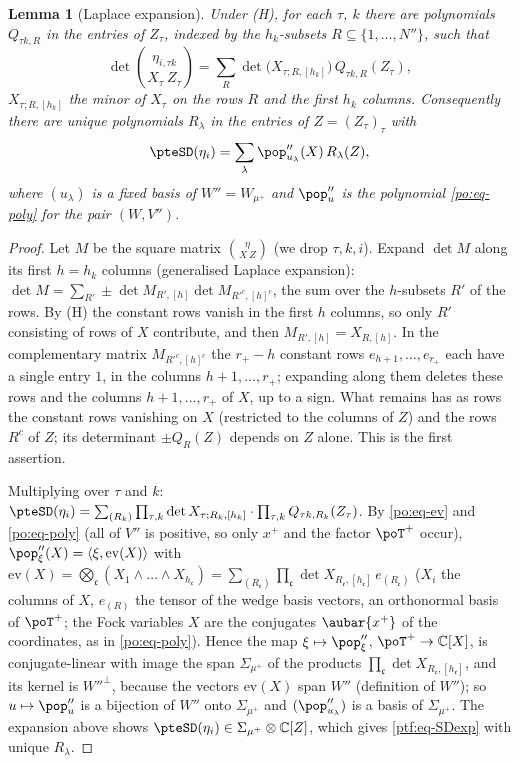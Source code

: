 \documentclass[10pt]{amsart}
\newtheorem{lemma}[theorem]{Lemma}
\theoremstyle{definition}
\theoremstyle{remark}
\newcommand{\C}{\mathbb C}
\begin{document}
\begin{lemma}[Laplace expansion]\label{ptf:laplace}
Under (H), for each $\tau$, $k$ there are polynomials $Q_{\tau k,R}$ in the entries of $Z_\tau$, indexed by
the $h_k$-subsets $R\subseteq\{1,\dots,N''\}$, such that
\[
\det\binom{\eta_{i,\tau k}}{X_\tau\ Z_\tau}=\sum_{R}\det\bigl(X_{\tau;R,[h_k]}\bigr)\,Q_{\tau k,R}(Z_\tau),
\]
$X_{\tau;R,[h_k]}$ the minor of $X_\tau$ on the rows $R$ and the first $h_k$ columns. Consequently there are
unique polynomials $R_\lambda$ in the entries of $Z=(Z_\tau)_\tau$ with
\begin{equation}\label{ptf:eq-SDexp}
\pteSD(\eta_i)=\sum_\lambda\pop''_{u_\lambda}(X)\,R_\lambda(Z),
\end{equation}
where $(u_\lambda)$ is a fixed basis of $W''=W_{\mu^+}$ and $\pop''_u$ is the polynomial \eqref{po:eq-poly} for the
pair $(W,V'')$.
\end{lemma}
\begin{proof}
Let $M$ be the square matrix $\binom{\eta}{X\ Z}$ (we drop $\tau,k,i$). Expand $\det M$ along its first $h=h_k$
columns (generalised Laplace expansion): $\det M=\sum_{R'}\pm\det M_{R',[h]}\det M_{R'^c,[h]^c}$, the sum over
the $h$-subsets $R'$ of the rows. By (H) the constant rows vanish in the first $h$ columns, so only $R'$
consisting of rows of $X$ contribute, and then $M_{R',[h]}=X_{R,[h]}$. In the complementary matrix
$M_{R'^c,[h]^c}$ the $r_+-h$ constant rows $e_{h+1},\dots,e_{r_+}$ each have a single entry $1$, in the columns
$h+1,\dots,r_+$; expanding along them deletes these rows and the columns $h+1,\dots,r_+$ of $X$, up to a sign.
What remains has as rows the constant rows vanishing on $X$ (restricted to the columns of $Z$) and the rows
$R^c$ of $Z$; its determinant $\pm Q_R(Z)$ depends on $Z$ alone. This is the first assertion.

Multiplying over $\tau$ and $k$: $\pteSD(\eta_i)=\sum_{(R_k)}\prod_{\tau,k}\det X_{\tau;R_k,[h_k]}\cdot\prod_{\tau,k}Q_{\tau k,R_k}
(Z_\tau)$. By \eqref{po:eq-ev} and \eqref{po:eq-poly} (all of $V''$ is positive, so only $x^+$ and the factor
$\poT^+$ occur), $\pop''_\xi(X)=\langle\xi,\mathrm{ev}(X)\rangle$ with $\mathrm{ev}(X)=\bigotimes_{\mathfrak c}(X_1\wedge\dots\wedge
X_{h_{\mathfrak c}})=\sum_{(R_{\mathfrak c})}\prod_{\mathfrak c}\det X_{R_{\mathfrak c},[h_{\mathfrak c}]}\,e_{(R_{\mathfrak c})}$ ($X_i$ the columns
of $X$, $e_{(R)}$ the tensor of the wedge basis vectors, an orthonormal basis of $\poT^+$; the Fock variables $X$
are the conjugates $\aubar{x^+}$ of the coordinates, as in \eqref{po:eq-poly}). Hence the map $\xi\mapsto\pop''_\xi$,
$\poT^+\to\C[X]$, is conjugate-linear with image the span $\Sigma_{\mu^+}$ of the products $\prod_{\mathfrak c}\det
X_{R_{\mathfrak c},[h_{\mathfrak c}]}$, and its kernel is $W''^\perp$, because the vectors $\mathrm{ev}(X)$ span $W''$
(definition of $W''$); so $u\mapsto\pop''_u$ is a bijection of $W''$ onto $\Sigma_{\mu^+}$ and $(\pop''_{u_\lambda})$ is a
basis of $\Sigma_{\mu^+}$. The expansion above shows $\pteSD(\eta_i)\in\Sigma_{\mu^+}\otimes\C[Z]$, which gives
\eqref{ptf:eq-SDexp} with unique $R_\lambda$.
\end{proof}
\end{document}
